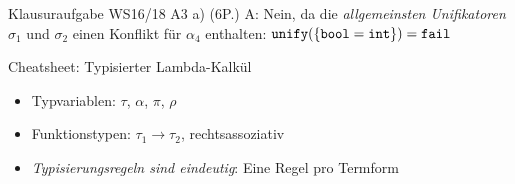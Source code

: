 \documentclass{beamer}
\begin{document}
\begin{frame}{Klausuraufgabe WS16/18 A3 a) (6P.)}
{    A: Nein, da die \emph{allgemeinsten Unifikatoren} $\sigma_1$ und $\sigma_2$ einen Konflikt für $\alpha_4$ enthalten:
    $\texttt{unify}(\{ \texttt{bool} = \texttt{int} \}) = \texttt{fail}$
  }

\end{frame}

\newcommand{\tikzmark}[3]{\tikz[baseline, remember picture]{
	\node[fill=#1,draw] (#2) {#3};
}}

\begin{frame}{Cheatsheet: Typisierter Lambda-Kalkül}

  \begin{itemize}
    \item Typvariablen: $\tau$, $\alpha$, $\pi$, $\rho$
    \item Funktionstypen: $\tau_1 \to \tau_2$, rechtsassoziativ
    \item \emph{Typisierungsregeln sind eindeutig}: Eine Regel pro Termform
  \end{itemize}
\end{frame}
\end{document}
